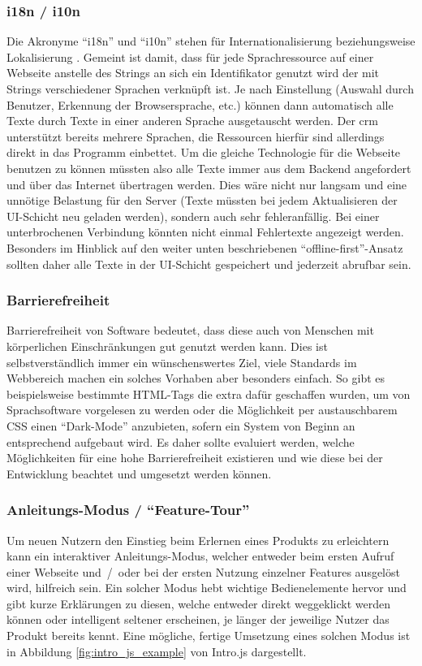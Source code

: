 \subsubsection{i18n / i10n}
Die Akronyme ``i18n'' und ``i10n'' stehen für Internationalisierung beziehungsweise Lokalisierung \parencite{i18n_i10n_ishida_w3c_miller_boeing_2018}. Gemeint ist damit, dass für jede Sprachressource auf einer Webseite anstelle des Strings an sich ein Identifikator genutzt wird der mit Strings verschiedener Sprachen verknüpft ist. Je nach Einstellung (Auswahl durch Benutzer, Erkennung der Browsersprache, etc.) können dann automatisch alle Texte durch Texte in einer anderen Sprache ausgetauscht werden. Der \gls{crm} unterstützt bereits mehrere Sprachen, die Ressourcen hierfür sind allerdings direkt in das Programm einbettet. Um die gleiche Technologie für die Webseite benutzen zu können müssten also alle Texte immer aus dem Backend angefordert und über das Internet übertragen werden. Dies wäre nicht nur langsam und eine unnötige Belastung für den Server (Texte müssten bei jedem Aktualisieren der UI-Schicht neu geladen werden), sondern auch sehr fehleranfällig. Bei einer unterbrochenen Verbindung könnten nicht einmal Fehlertexte angezeigt werden. Besonders im Hinblick auf den weiter unten beschriebenen ``offline-first''-Ansatz sollten daher alle Texte in der UI-Schicht gespeichert und jederzeit abrufbar sein.

\subsubsection{Barrierefreiheit}
Barrierefreiheit von Software bedeutet, dass diese auch von Menschen mit körperlichen Einschränkungen gut genutzt werden kann. Dies ist selbstverständlich immer ein wünschenswertes Ziel, viele Standards im Webbereich machen ein solches Vorhaben aber besonders einfach. So gibt es beispielsweise bestimmte HTML-Tags die extra dafür geschaffen wurden, um von Sprachsoftware vorgelesen zu werden oder die Möglichkeit per austauschbarem CSS einen ``Dark-Mode''  anzubieten, sofern ein System von Beginn an entsprechend aufgebaut wird.
Es daher sollte evaluiert werden, welche Möglichkeiten für eine hohe Barrierefreiheit existieren und wie diese bei der Entwicklung beachtet und umgesetzt werden können.

\subsubsection{Anleitungs-Modus / ``Feature-Tour''}
 Um neuen Nutzern den Einstieg beim Erlernen eines Produkts zu erleichtern kann ein interaktiver Anleitungs-Modus, welcher entweder beim ersten Aufruf einer Webseite und~/~oder bei der ersten Nutzung einzelner Features ausgelöst wird, hilfreich sein. Ein solcher Modus hebt wichtige Bedienelemente hervor und gibt kurze Erklärungen zu diesen, welche entweder direkt weggeklickt werden können oder intelligent seltener erscheinen, je länger der jeweilige Nutzer das Produkt bereits kennt. Eine mögliche, fertige Umsetzung eines solchen Modus ist in Abbildung \ref{fig:intro_js_example} von Intro.js  dargestellt.

